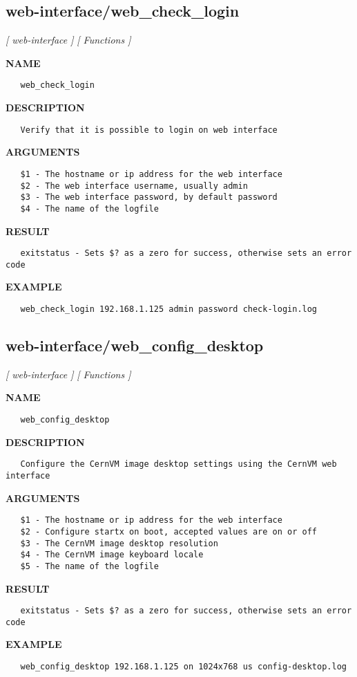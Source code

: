 \subsection{web-interface/web\_check\_login}
\textsl{[ web-interface ]}
\textsl{[ Functions ]}

\label{ch:robo63}
\label{ch:web_interface_web_check_login}
\textbf{NAME}
\begin{verbatim}
   web_check_login
\end{verbatim}
\textbf{DESCRIPTION}
\begin{verbatim}
   Verify that it is possible to login on web interface
\end{verbatim}
\textbf{ARGUMENTS}
\begin{verbatim}
   $1 - The hostname or ip address for the web interface
   $2 - The web interface username, usually admin
   $3 - The web interface password, by default password
   $4 - The name of the logfile
\end{verbatim}
\textbf{RESULT}
\begin{verbatim}
   exitstatus - Sets $? as a zero for success, otherwise sets an error code
\end{verbatim}
\textbf{EXAMPLE}
\begin{verbatim}
   web_check_login 192.168.1.125 admin password check-login.log
\end{verbatim}
\newpage
\subsection{web-interface/web\_config\_desktop}
\textsl{[ web-interface ]}
\textsl{[ Functions ]}

\label{ch:robo64}
\label{ch:web_interface_web_config_desktop}
\textbf{NAME}
\begin{verbatim}
   web_config_desktop
\end{verbatim}
\textbf{DESCRIPTION}
\begin{verbatim}
   Configure the CernVM image desktop settings using the CernVM web interface
\end{verbatim}
\textbf{ARGUMENTS}
\begin{verbatim}
   $1 - The hostname or ip address for the web interface
   $2 - Configure startx on boot, accepted values are on or off
   $3 - The CernVM image desktop resolution
   $4 - The CernVM image keyboard locale
   $5 - The name of the logfile
\end{verbatim}
\textbf{RESULT}
\begin{verbatim}
   exitstatus - Sets $? as a zero for success, otherwise sets an error code
\end{verbatim}
\textbf{EXAMPLE}
\begin{verbatim}
   web_config_desktop 192.168.1.125 on 1024x768 us config-desktop.log
\end{verbatim}
\newpage
